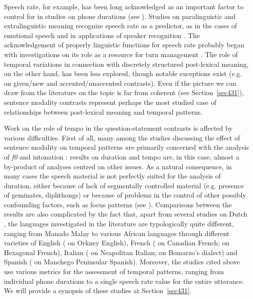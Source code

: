 Speech rate, for example, has been long acknowledged as an important factor to control for in studies on phone durations (see \citealt{turk2006acoustic}). Studies on paralinguistic and extralinguistic meaning recognize speech rate as a predictor, as in the cases of emotional speech \citep{williams1972emotions} and in applications of speaker recognition \citep{vanheerden2007speech}. The acknowledgement of properly linguistic functions for speech rate probably began with investigations on its role as a resource for turn management \citep{duncan1972signals}. The role of temporal variations in connection with discretely structured post-lexical meaning, on the other hand, has been less explored, though notable exceptions exist (e.g. \citealt{eefting1991effect} on given/new and accented/unaccented contrasts). Even if the picture we can draw from the literature on the topic is far from coherent (see Section~\ref{sec431}), sentence modality contrasts represent perhaps the most studied case of relationships between post-lexical meaning and temporal patterns.

Work on the role of tempo in the question-statement contrasts is affected by various difficulties. First of all, many among the studies discussing the effect of sentence modality on temporal patterns are primarily concerned with the analysis of \textit{f0} and intonation \citep{maturi1988intonazione,ryalls1994effects,smith2002prosodic,rialland2007question,petrone2008role}: results on duration and tempo are, in this case, almost a by-product of analyses centred on other issues. As a natural consequence, in many cases the speech material is not perfectly suited for the analysis of duration, either because of lack of segmentally controlled material  (e.g. presence of geminates, diphthongs) or because of problems in the control of other possibly confounding factors, such as focus patterns (see \citealt{gubian2011joint}). Comparisons between the results are also complicated by the fact that, apart from several studies on Dutch \citep{vanheuven2000phonetic,vanheuven2002temporal,vanheuven2005speech}, the languages investigated in the literature are typologically quite different, ranging from Manado Malay \citep{vanheuven2005speech} to various African languages \citep{rialland2007question} through different varieties of English (\citealt{vanheuven2005speech} on Orkney English), French (\citealt{ryalls1994effects} on Canadian French; \citealt{smith2002prosodic} on Hexagonal French), Italian (\citealt{maturi1988intonazione,petrone2008role} on Neapolitan Italian; \citealt{dedominicis2010interrogative} on Bomarzo’s dialect) and Spanish (\citealt{henriksen2012intonation} on Manchego Peninsular Spanish). Moreover, the studies cited above use various metrics for the assessment of temporal patterns, ranging from individual phone durations to a single speech rate value for the entire utterance. We will provide a synopsis of these studies at Section~\ref{sec431}.

